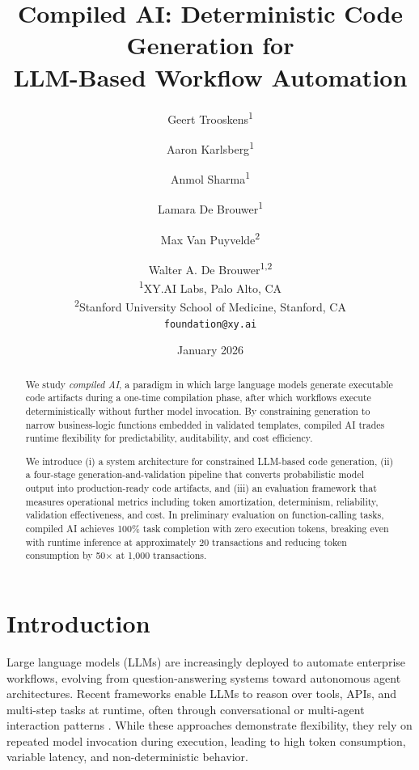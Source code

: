 \documentclass[11pt]{article}
\title{Compiled AI: Deterministic Code Generation for\\LLM-Based Workflow Automation}
\author{
  Geert Trooskens\textsuperscript{1} \and
  Aaron Karlsberg\textsuperscript{1} \and
  Anmol Sharma\textsuperscript{1} \and
  Lamara De Brouwer\textsuperscript{1} \and
  Max Van Puyvelde\textsuperscript{2} \and
  Walter A. De Brouwer\textsuperscript{1,2}
  \\[1em]
  \textsuperscript{1}XY.AI Labs, Palo Alto, CA \\
  \textsuperscript{2}Stanford University School of Medicine, Stanford, CA \\[0.5em]
  \texttt{foundation@xy.ai}
}
\date{January 2026}
\begin{document}
\maketitle

\begin{abstract}

We study \emph{compiled AI}, a paradigm in which large language models generate executable code artifacts during a one-time compilation phase, after which workflows execute deterministically without further model invocation. By constraining generation to narrow business-logic functions embedded in validated templates, compiled AI trades runtime flexibility for predictability, auditability, and cost efficiency.

We introduce (i) a system architecture for constrained LLM-based code generation, (ii) a four-stage generation-and-validation pipeline that converts probabilistic model output into production-ready code artifacts, and (iii) an evaluation framework that measures operational metrics including token amortization, determinism, reliability, validation effectiveness, and cost. In preliminary evaluation on function-calling tasks, compiled AI achieves 100\% task completion with zero execution tokens, breaking even with runtime inference at approximately 20 transactions and reducing token consumption by 50$\times$ at 1,000 transactions.

\end{abstract}

\section{Introduction}
\label{sec:introduction}

Large language models (LLMs) are increasingly deployed to automate enterprise workflows, evolving from question-answering systems toward autonomous agent architectures. Recent frameworks enable LLMs to reason over tools, APIs, and multi-step tasks at runtime, often through conversational or multi-agent interaction patterns \citep{autogen2024, crewai2024, langchain2022}. While these approaches demonstrate flexibility, they rely on repeated model invocation during execution, leading to high token consumption, variable latency, and non-deterministic behavior.
\end{document}
